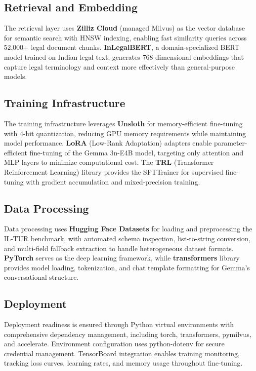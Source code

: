 \documentclass[11pt]{article}
\begin{document}
\subsection{Retrieval and Embedding}

The retrieval layer uses \textbf{Zilliz Cloud} (managed Milvus) as the vector database for semantic search with HNSW indexing, enabling fast similarity queries across 52,000+ legal document chunks. \textbf{InLegalBERT}, a domain-specialized BERT model trained on Indian legal text, generates 768-dimensional embeddings that capture legal terminology and context more effectively than general-purpose models.

\subsection{Training Infrastructure}

The training infrastructure leverages \textbf{Unsloth} for memory-efficient fine-tuning with 4-bit quantization, reducing GPU memory requirements while maintaining model performance. \textbf{LoRA} (Low-Rank Adaptation) adapters enable parameter-efficient fine-tuning of the Gemma 3n-E4B model, targeting only attention and MLP layers to minimize computational cost. The \textbf{TRL} (Transformer Reinforcement Learning) library provides the SFTTrainer for supervised fine-tuning with gradient accumulation and mixed-precision training.

\subsection{Data Processing}

Data processing uses \textbf{Hugging Face Datasets} for loading and preprocessing the IL-TUR benchmark, with automated schema inspection, list-to-string conversion, and multi-field fallback extraction to handle heterogeneous dataset formats. \textbf{PyTorch} serves as the deep learning framework, while \textbf{transformers} library provides model loading, tokenization, and chat template formatting for Gemma's conversational structure.

\subsection{Deployment}

Deployment readiness is ensured through Python virtual environments with comprehensive dependency management, including torch, transformers, pymilvus, and accelerate. Environment configuration uses python-dotenv for secure credential management. TensorBoard integration enables training monitoring, tracking loss curves, learning rates, and memory usage throughout fine-tuning.
\end{document}

